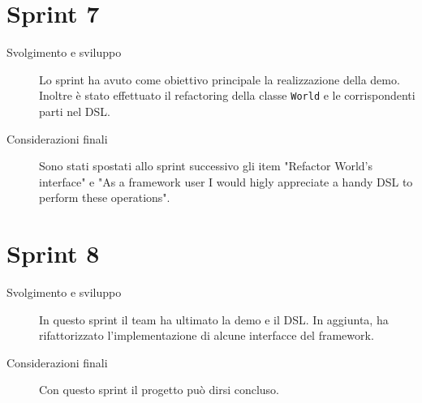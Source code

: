 \section{Sprint 7}\label{sec:sprint-7}
\begin{description}
    \item[Svolgimento e sviluppo] Lo sprint ha avuto come obiettivo principale la realizzazione della demo.
    Inoltre è stato effettuato il refactoring della classe \texttt{World} e le corrispondenti parti nel DSL\@.
    \item[Considerazioni finali] Sono stati spostati allo sprint successivo gli item "Refactor World's interface" e "As a framework user I would higly appreciate a handy DSL to perform these operations".
\end{description}
\section{Sprint 8}\label{sec:sprint-8}
\begin{description}
    \item[Svolgimento e sviluppo] In questo sprint il team ha ultimato la demo e il DSL. In aggiunta, ha rifattorizzato l'implementazione di alcune interfacce del framework.
    \item[Considerazioni finali] Con questo sprint il progetto può dirsi concluso.
\end{description}